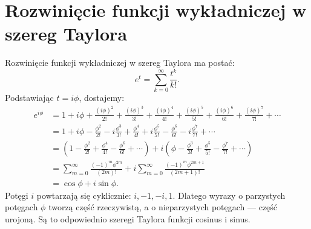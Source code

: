 \documentclass{article}
\begin{document}
\section{Rozwinięcie funkcji wykładniczej w szereg Taylora}
Rozwinięcie funkcji wykładniczej w szereg Taylora ma postać:
\[
    e^t = \sum_{k=0}^{\infty}\frac{t^k}{k!}.
\]
Podstawiając $t=i\phi$, dostajemy:
\begin{align*}
    e^{i\phi}
    &= 1+i\phi+\frac{(i\phi)^2}{2!}
       +\frac{(i\phi)^3}{3!}+\frac{(i\phi)^4}{4!}
       +\frac{(i\phi)^5}{5!}+\frac{(i\phi)^6}{6!}
       +\frac{(i\phi)^7}{7!}+\cdots \\
    &= 1+i\phi-\frac{\phi^2}{2!}-i\frac{\phi^3}{3!}
       +\frac{\phi^4}{4!}+i\frac{\phi^5}{5!}
       -\frac{\phi^6}{6!}-i\frac{\phi^7}{7!}+\cdots \\
    &= \left(1-\frac{\phi^2}{2!}+\frac{\phi^4}{4!}
       -\frac{\phi^6}{6!}+\cdots\right)
       +i\left(\phi-\frac{\phi^3}{3!}+\frac{\phi^5}{5!}
       -\frac{\phi^7}{7!}+\cdots\right) \\
    &= \sum_{m=0}^{\infty}\frac{(-1)^m\phi^{2m}}{(2m)!}
       +i\sum_{m=0}^{\infty}\frac{(-1)^m\phi^{2m+1}}{(2m+1)!} \\
    &= \cos\phi+i\sin\phi.
\end{align*}
Potęgi $i$ powtarzają się cyklicznie: $i, -1, -i, 1$. Dlatego wyrazy
o parzystych potęgach $\phi$ tworzą część rzeczywistą, a o nieparzystych
potęgach — część urojoną. Są to odpowiednio szeregi Taylora funkcji
cosinus i sinus.

\end{document}
